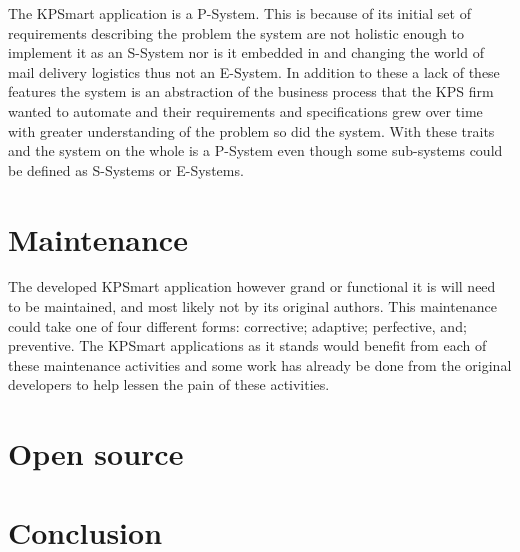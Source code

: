 \documentclass{style/CRPITStyle}
\renewcommand{\cite}{\citep}
\begin{document}
\vspace{.1in}

The KPSmart application is a P-System. This is because of its initial set of
requirements describing the problem the system are not holistic enough to
implement it as an S-System nor is it embedded in and changing the world of mail
delivery logistics thus not an E-System. In addition to these a lack of
these features the system is an abstraction of the business process that the
KPS firm wanted to automate and their requirements and specifications grew over
time with greater understanding of the problem so did the system. With these
traits and the system on the whole is a P-System even though some sub-systems
could be defined as S-Systems or E-Systems.

\section{Maintenance}
%
%
%

The developed KPSmart application however grand or functional it is will need
to be maintained, and most likely not by its original authors. This maintenance
could take one of four different forms: corrective; adaptive; perfective, and;
preventive. The KPSmart applications as it stands would benefit from each of
these maintenance activities and some work has already be done from the original
developers to help lessen the pain of these activities.

\cite{Pigoski:1996}

\section{Open source}

\cite{raymond:1999}

\section{Conclusion}



\end{document}
